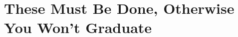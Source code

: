 \chapter{These Must Be Done, Otherwise You Won't Graduate}
\label{must-do}



 \clearpage

 \clearpage



